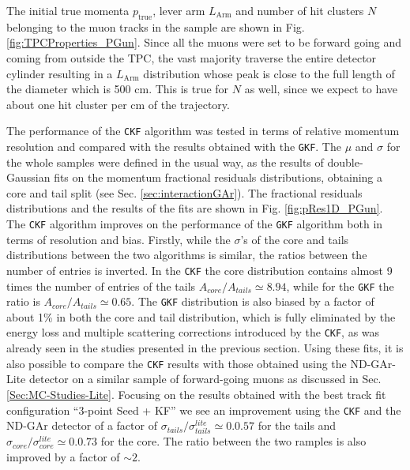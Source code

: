 The initial true momenta $p_\textrm{true}$, lever arm $L_\textrm{Arm}$ and number of hit clusters $N$ belonging to the muon tracks in the sample are shown in Fig. \ref{fig:TPCProperties_PGun}. Since all the muons were set to be forward going and coming from outside the TPC, the vast majority traverse the entire detector cylinder resulting in a $L_\textrm{Arm}$ distribution whose peak is close to the full length of the diameter which is 500 cm. This is true for $N$ as well, since we expect to have about one hit cluster per cm of the trajectory.

The performance of the \texttt{CKF} algorithm was tested in terms of relative momentum resolution and compared with the results obtained with the \texttt{GKF}. The $\mu$ and $\sigma$ for the whole samples were defined in the usual way, as the results of double-Gaussian fits on the momentum fractional residuals distributions, obtaining a core and tail split (see Sec. \ref{sec:interactionGAr}). The fractional residuals distributions and the results of the fits are shown in Fig. \ref{fig:pRes1D_PGun}. The \texttt{CKF} algorithm improves on the performance of the \texttt{GKF} algorithm both in terms of resolution and bias. Firstly, while the $\sigma$'s of the core and tails distributions between the two algorithms is similar, the ratios between the number of entries is inverted. In the \texttt{CKF}  the core distribution contains almost 9 times the number of entries of the tails $A_{core}/A_{tails}\simeq 8.94$, while for the \texttt{GKF} the ratio is $A_{core}/A_{tails}\simeq 0.65$. The \texttt{GKF} distribution is also biased by a factor of about 1\% in both the core and tail distribution, which is fully eliminated by the energy loss and multiple scattering corrections introduced by the \texttt{CKF}, as was already seen in the studies presented in the previous section. Using these fits, it is also possible to compare the \texttt{CKF} results with those obtained using the ND-GAr-Lite detector on a similar sample of forward-going muons as discussed in Sec. \ref{Sec:MC-Studies-Lite}. Focusing on the results obtained with the best track fit configuration \enquote{3-point Seed + KF} we see an improvement using the \texttt{CKF} and the ND-GAr detector of a factor of  $\sigma_{tails}/\sigma_{tails}^{lite}\simeq0.0.57$ for the tails and $\sigma_{core}/\sigma_{core}^{lite}\simeq0.0.73$ for the core. The ratio between the two ramples is also improved by a factor of $\sim 2$.

